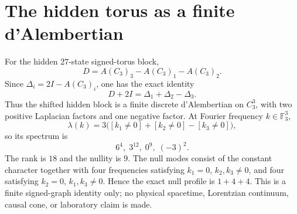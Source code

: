 \section{The hidden torus as a finite d'Alembertian}
\label{sec:bt3385-hidden-torus-dalembertian}
For the hidden $27$-state signed-torus block,
\[
 D=A(C_3)_{3}-A(C_3)_{1}-A(C_3)_{2}.
\]
Since $\Delta_i=2I-A(C_3)_i$, one has the exact identity
\[
 \boxed{D+2I=\Delta_1+\Delta_2-\Delta_3.}
\]
Thus the shifted hidden block is a finite discrete d'Alembertian on $C_3^3$, with two positive Laplacian factors and one negative factor.  At Fourier frequency $k\in\mathbb F_3^3$,
\[
 \lambda(k)=3\bigl([k_1\ne0]+[k_2\ne0]-[k_3\ne0]\bigr),
\]
so its spectrum is
\[
 \boxed{6^4,\;3^{12},\;0^9,\;(-3)^2}.
\]
The rank is $18$ and the nullity is $9$.  The null modes consist of the constant character together with four frequencies satisfying $k_1=0$, $k_2,k_3\ne0$, and four satisfying $k_2=0$, $k_1,k_3\ne0$.  Hence the exact null profile is $1+4+4$.  This is a finite signed-graph identity only; no physical spacetime, Lorentzian continuum, causal cone, or laboratory claim is made.
